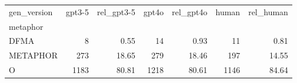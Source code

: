 \begin{tabular}{lrrrrrr}
\toprule
gen_version & gpt3-5 & rel_gpt3-5 & gpt4o & rel_gpt4o & human & rel_human \\
metaphor &  &  &  &  &  &  \\
\midrule
DFMA & 8 & 0.55 & 14 & 0.93 & 11 & 0.81 \\
METAPHOR & 273 & 18.65 & 279 & 18.46 & 197 & 14.55 \\
O & 1183 & 80.81 & 1218 & 80.61 & 1146 & 84.64 \\
\bottomrule
\end{tabular}
